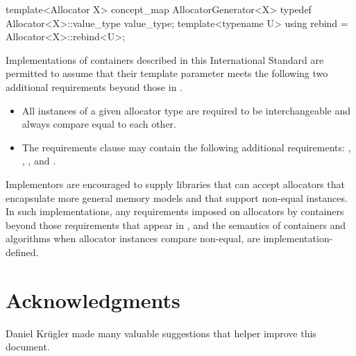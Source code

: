 \documentclass[american,twoside]{book}
\begin{document}
\pnum {}
\color{addclr}
\begin{itemdecl}
template<Allocator X>
concept_map AllocatorGenerator<X> {
  typedef Allocator<X>::value_type value_type;
  template<typename U> using rebind = Allocator<X>::rebind<U>;
}
\end{itemdecl}
\color{black}

\pnum
Implementations of containers described in this International Standard
are permitted to assume that their  template parameter meets
the following two additional requirements beyond those in
.

\begin{itemize}
\item
All instances of a given allocator type are required to be interchangeable
and always compare equal to each other.
\item
{} \color{addclr}The
requirements clause may contain the following additional requirements: 
, , , and
.
\end{itemize}

\pnum
Implementors are encouraged to supply libraries that can accept allocators
that encapsulate more general memory models and that support non-equal
instances.
In such implementations, any requirements imposed on allocators
by containers beyond those requirements that appear in
, and the
semantics of containers and algorithms when allocator instances compare
non-equal, are implementation-defined.

\section*{Acknowledgments}
Daniel Kr\"ugler made many valuable suggestions that helper improve
this document. 
\end{document}
